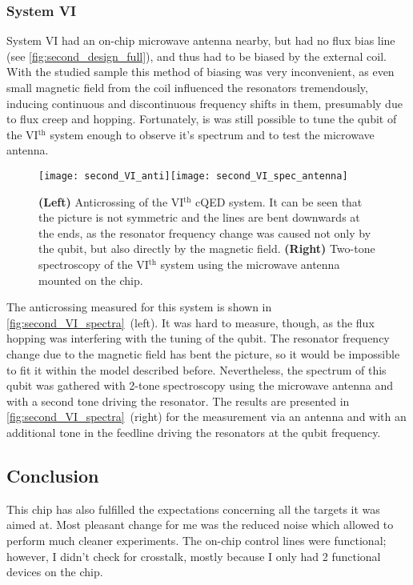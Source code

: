 \documentclass[12pt, twoside]{report}
\numberwithin{equation}{section}
\begin{document}
\subsubsection{System VI}

System VI had an on-chip microwave antenna nearby, but had no flux bias line (see \autoref{fig:second_design_full}), and thus had to be biased by the external coil. With the studied sample this method of biasing was very inconvenient, as even small magnetic field from the coil influenced the resonators tremendously, inducing continuous and discontinuous frequency shifts in them, presumably due to flux creep and hopping. Fortunately, is was still possible to tune the qubit of the VI$^{\text{th}}$ system enough to observe it's spectrum and to test the microwave antenna.

\begin{figure}[h!]
\centering
\texttt{[image: second\_VI\_anti]}\texttt{[image: second\_VI\_spec\_antenna]}

\caption{\textbf{(Left)} Anticrossing of the VI$^{\text{th}}$ cQED system. It can be seen that the picture is not symmetric and  the lines are bent downwards at the ends, as the resonator frequency change was caused not only by the qubit, but also directly by the magnetic field. \textbf{(Right)} Two-tone spectroscopy of the VI$^{\text{th}}$ system using the microwave antenna mounted on the chip.}
\label{fig:second_VI_spectra}
\end{figure}

The anticrossing measured for this system is shown in \autoref{fig:second_VI_spectra}~(left). It was hard to measure, though, as the flux hopping was interfering with the tuning of the qubit. The resonator frequency change due to the magnetic field has bent the picture, so it would be impossible to fit it within the model described before. Nevertheless, the spectrum of this qubit was gathered with 2-tone spectroscopy using the microwave antenna and with a second tone driving the resonator. The results are presented in \autoref{fig:second_VI_spectra}~(right) for the measurement via an antenna and with an additional tone in the feedline driving the resonators at the qubit frequency.

\subsection{Conclusion} 

This chip has also fulfilled the expectations concerning all the targets it was aimed at. Most pleasant change for me was the reduced noise which allowed to perform much cleaner experiments. The on-chip control lines were functional; however, I didn't check for crosstalk, mostly because I only had 2 functional devices on the chip. 
\end{document}
